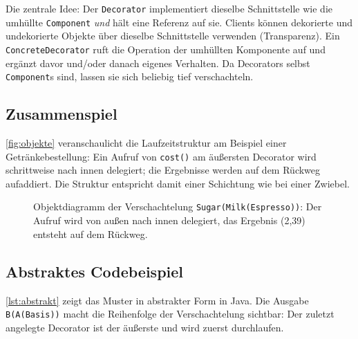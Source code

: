 \documentclass[a4paper,11pt,toc=listof,toc=bibliography]{scrartcl}
\begin{document}
Die zentrale Idee: Der \texttt{Decorator} implementiert dieselbe Schnittstelle wie die umhüllte \texttt{Component} \emph{und} hält eine Referenz auf sie. Clients können dekorierte und undekorierte Objekte über dieselbe Schnittstelle verwenden (Transparenz). Ein \texttt{ConcreteDecorator} ruft die Operation der umhüllten Komponente auf und ergänzt davor und/oder danach eigenes Verhalten. Da Decorators selbst \texttt{Component}s sind, lassen sie sich beliebig tief verschachteln.

\subsection{Zusammenspiel}
\autoref{fig:objekte} veranschaulicht die Laufzeitstruktur am Beispiel einer Getränkebestellung: Ein Aufruf von \texttt{cost()} am äußersten Decorator wird schrittweise nach innen delegiert; die Ergebnisse werden auf dem Rückweg aufaddiert. Die Struktur entspricht damit einer Schichtung wie bei einer Zwiebel.

\begin{figure}[H]
  \centering
  \caption{Objektdiagramm der Verschachtelung \texttt{Sugar(Milk(Espresso))}: Der Aufruf wird von außen nach innen delegiert, das Ergebnis (2,39) entsteht auf dem Rückweg.}
  \label{fig:objekte}
\end{figure}

\subsection{Abstraktes Codebeispiel}
\autoref{lst:abstrakt} zeigt das Muster in abstrakter Form in Java. Die Ausgabe \texttt{B(A(Basis))} macht die Reihenfolge der Verschachtelung sichtbar: Der zuletzt angelegte Decorator ist der äußerste und wird zuerst durchlaufen.
\end{document}
